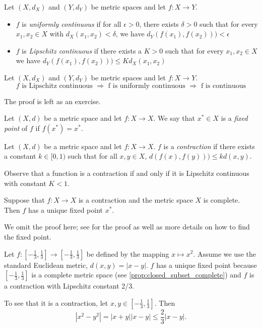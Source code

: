 \documentclass{article}
\begin{document}
\begin{definition}
Let $(X,d_X)$ and $(Y,d_Y)$ be metric spaces and let $f:X\to Y$. 
\begin{itemize}
    \item $f$ is \emph{uniformly continuous} if for all $\epsilon>0$, there exists $\delta > 0$ such that for every $x_1,x_2\in X$ with $d_X(x_1,x_2) < \delta$, we have  $d_Y(f(x_1),f(x_2))) < \epsilon$ 
    \item $f$ is \emph{Lipschitz continuous} if there exists a $K > 0$ such that for every $x_1,x_2\in X$ we have  $d_Y(f(x_1),f(x_2))) \leq K d_X(x_1,x_2)$
\end{itemize}
\end{definition}

\begin{proposition}
Let $(X,d_X)$ and $(Y,d_Y)$ be metric spaces and let $f:X\to Y$. 
$$f \text{ is Lipschitz continuous } \Rightarrow \text{ f is uniformly continuous } \Rightarrow \text{ f is continuous}$$
\end{proposition}

The proof is left as an exercise. 

\begin{definition}
Let $(X,d)$ be a metric space and let $f:X \to X$. We say that $x^* \in X$ is a \emph{fixed point} of $f$ if $f(x^*) = x^*$.
\end{definition}

\begin{definition}
Let $(X,d)$ be a metric space and let $f:X \to X$. $f$ is a \emph{contraction} if there exists a constant $k \in [0,1)$ such that for all $x,y \in X$, $d(f(x),f(y))) \leq k d(x,y)$.
\end{definition}

Observe that a function is a contraction if and only if it is Lipschitz continuous with constant $K < 1$.

\begin{theorem}
Suppose that $f : X \to X$ is a contraction and the metric space $X$ is complete. Then $f$ has a unique fixed point $x^*$.
\end{theorem}

We omit the proof here; see \cite[p.240]{realanalysis} for the proof as well as more details on how to find the fixed point.

\begin{example}
Let $f:\left[-\frac{1}{3},\frac{1}{3}\right] \to \left[-\frac{1}{3},\frac{1}{3}\right]$ be defined by the mapping $x \mapsto x^2$. Assume we use the standard Euclidean metric, $d(x,y) = |x-y|$. $f$ has a unique fixed point because $\left[-\frac{1}{3},\frac{1}{3}\right]$ is a complete metric space (see \cref{prop:closed_subset_complete}) and $f$ is a contraction with Lipschitz constant 2/3.

To see that it is a contraction, let $x,y \in \left[-\frac{1}{3},\frac{1}{3}\right]$. Then
\begin{equation*}
   |x^2 - y^2| = |x+y| |x-y| \leq \frac{2}{3} |x-y|. 
\end{equation*}
\end{example}
\end{document}
